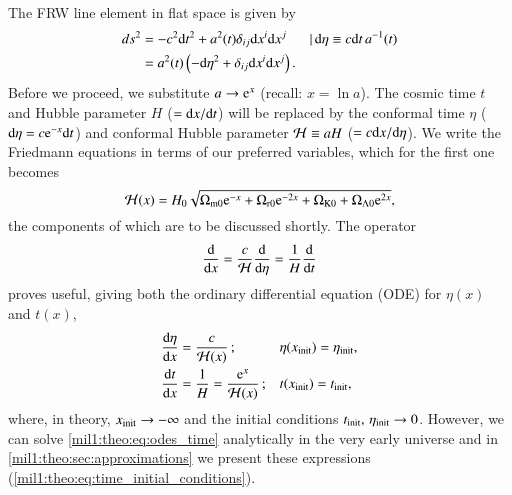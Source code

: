 

The FRW line element in flat space is given by
\begin{equation}\label{mil1:theo:eq:FRW}
    \begin{split}
        d s^2 &= -c^2\diff t^2 + a^2(t) \delta_{ij} \diff x^i \diff x^j && |\, \diff \eta \equiv c\diff t\, a^{-1}(t) \\%
                &= a^2(t) \left( -\diff \eta^2 + \delta_{ij} \diff x^i \diff x^j \right).
    \end{split}
\end{equation}
Before we proceed, we substitute $a\to \mathrm{e}^x$ (recall: $x=\ln{a}$). The cosmic time $t$ and Hubble parameter $H$ ($=\mathrm{d} x/\mathrm{d} t$) will be replaced by the conformal time $\eta$ ($\mathrm{d} \eta = c\mathrm{e}^{-x}\mathrm{d} t$) and conformal Hubble parameter $\mathcal{H}\equiv aH$ ($=c\mathrm{d} x/\mathrm{d} \eta$). We write the Friedmann equations in terms of our preferred variables, which for the first one becomes
\begin{equation}\label{mil1:theo:eq:Hp_of_x}
    \mathcal{H}(x) = H_0 \sqrt{\Omega_{\mathrm{m}0} \mathrm{e}^{-x} + \Omega_{\mathrm{r}0} \mathrm{e}^{-2x}  + \Omega_{\mathrm{K}0} + \Omega_{\mathrm{\Lambda}0} \mathrm{e}^{2x}},
\end{equation}
the components of which are to be discussed shortly. The operator 
\begin{equation}
    \dv{}{x} = \frac{c}{\mathcal{H}} \dv{}{\eta} = \frac{1}{H} \dv{}{t}
\end{equation}
proves useful, giving both the ordinary differential equation (ODE) for $\eta(x)$ and $t(x)$,
\begin{subequations}\label{mil1:theo:eq:odes_time}
    \begin{align}
        \dv{\eta}{x} &= \frac{c}{\mathcal{H}(x)}\,; &&  \eta(x_\mathrm{init}) = \eta_\mathrm{init} ,\label{mi1:theo:eq:ode_eta_of_x}\\
        \dv{t}{x} &= \frac{1}{H} = \frac{\mathrm{e}^x}{\mathcal{H}(x)}\,; && t(x_\mathrm{init}) = t_\mathrm{init},\label{mi1:theo:eq:ode_t_of_x}
    \end{align}
\end{subequations}
where, in theory, $x_\mathrm{init}\to -\infty$ and the initial conditions $t_\mathrm{init},\, \eta_\mathrm{init} \to 0$. However, we can solve \cref{mil1:theo:eq:odes_time} analytically in the very early universe and in \cref{mil1:theo:sec:approximations} we present these expressions (\cref{mil1:theo:eq:time_initial_conditions}).

